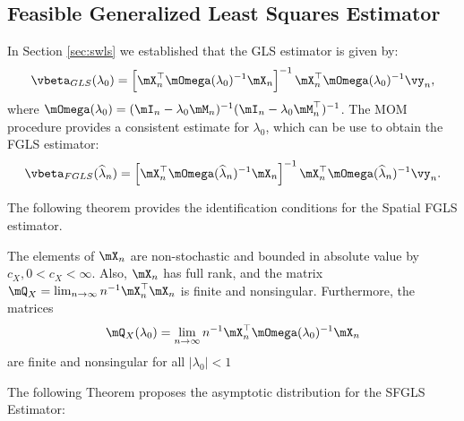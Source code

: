 \documentclass[english,12pt]{book}\usepackage[]{graphicx}\usepackage[]{xcolor}
\begin{document}
\subsection{Feasible Generalized Least Squares Estimator}

In Section \ref{sec:swls} we established that the GLS estimator is given by:
\begin{equation}\label{eq:beta_gls_gm}
\vbeta_{GLS}(\lambda_0) =\left[\mX^\top_n\mOmega(\lambda_0)^{-1}\mX_n\right]^{-1}\mX^\top_n\mOmega(\lambda_0)^{-1}\vy_n,
\end{equation}
%
where $\mOmega(\lambda_0) = (\mI_n - \lambda_0\mM_n)^{-1}(\mI_n - \lambda_0\mM^\top_n)^{-1}$. The MOM procedure provides a consistent estimate for $\lambda_0$, which can be use to obtain the FGLS estimator:
\begin{equation}\label{eq:beta_fgls}
\vbeta_{FGLS}(\widehat{\lambda}_n) =\left[\mX^\top_n\mOmega(\widehat{\lambda}_n)^{-1}\mX_n\right]^{-1}\mX^\top_n\mOmega(\widehat{\lambda}_n)^{-1}\vy_n.
\end{equation}

The following theorem provides the identification conditions for the Spatial FGLS estimator.
\begin{assumption}\label{assu:X_bounded_fgls}
  The elements of $\mX_n$ are non-stochastic and bounded in absolute value by $c_X, 0 < c_X < \infty$. Also, $\mX_n$ has full rank, and the matrix $\mQ_X = \lim_{n\to\infty}n^{-1}\mX^\top_n\mX_n$ is finite and nonsingular. Furthermore, the matrices
\begin{equation*}
\mQ_X(\lambda_0) = \lim_{n\to \infty} n^{-1}\mX^\top_n\mOmega(\lambda_0)^{-1}\mX_n 
\end{equation*}
%
are finite and nonsingular for all $\left|\lambda_0\right| < 1$
\end{assumption}

The following Theorem proposes the asymptotic distribution for the SFGLS Estimator:
\end{document}
